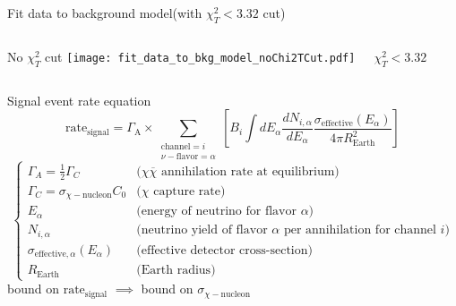 \documentclass[14pt]{beamer}
\begin{document}
\begin{frame}{Fit data to background model}{(with $\chi^{2}_{T} < 3.32$ cut)}
	\begin{columns}[t]
		\centering
		\begin{block}{\centering No $\chi^{2}_{T}$ cut}
			\centering
			\texttt{[image: fit\_data\_to\_bkg\_model\_noChi2TCut.pdf]}
		\end{block}
		\centering
		\begin{block}{\centering $\chi^{2}_{T} < 3.32$}
			\centering
		\end{block}
	\end{columns}
\end{frame}

\begin{frame}{Signal event rate equation}
	\begin{equation*}
		\text{rate}_{\text{signal}} = \Gamma_{\text{A}} \times
		\sum\limits_{\substack{\text{channel} = i\\ \nu-\text{flavor}= \alpha}}
		\left[
			B_{i} \int dE_{\alpha} \frac{dN_{i,\alpha}}{dE_{\alpha}}
			\frac{\sigma_{\text{effective}}(E_{\alpha})}
			{4\pi R_{\text{Earth}}^2}
		\right]
	\end{equation*}
	{\scriptsize
	\begin{equation*}
		\begin{cases}
			\Gamma_{A} = \frac{1}{2}\Gamma_{C}
				& \text{($\chi \overline{\chi}$ annihilation rate at equilibrium)}\\
			\Gamma_{C} = \sigma_{\chi-\text{nucleon}} C_{0}
				& \text{($\chi$ capture rate)}\\
			E_{\alpha}
				& \text{(energy of neutrino for flavor $\alpha$)}\\
			N_{i,\alpha}
				& \text{(neutrino yield of flavor $\alpha$ per annihilation for channel $i$)}\\
			\sigma_{\text{effective},\alpha}(E_{\alpha})
				& \text{(effective detector cross-section)}\\
			R_{\text{Earth}} & \text{(Earth radius)}
		\end{cases}
	\end{equation*}
	}
	bound on $\text{rate}_{\text{signal}}$
	$\implies$ bound on $\sigma_{\chi-\mathrm{nucleon}}$
\end{frame}
\end{document}

